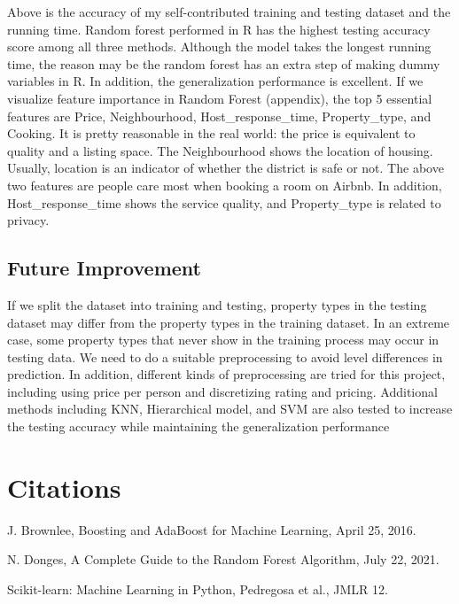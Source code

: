 \documentclass[11pt,]{article}
\begin{document}
Above is the accuracy of my self-contributed training and testing
dataset and the running time. Random forest performed in R has the
highest testing accuracy score among all three methods. Although the
model takes the longest running time, the reason may be the random
forest has an extra step of making dummy variables in R. In addition,
the generalization performance is excellent. If we visualize feature
importance in Random Forest (appendix), the top 5 essential features are
Price, Neighbourhood, Host\_response\_time, Property\_type, and Cooking.
It is pretty reasonable in the real world: the price is equivalent to
quality and a listing space. The Neighbourhood shows the location of
housing. Usually, location is an indicator of whether the district is
safe or not. The above two features are people care most when booking a
room on Airbnb. In addition, Host\_response\_time shows the service
quality, and Property\_type is related to privacy.

\hypertarget{future-improvement}{%
\subsection{Future Improvement}\label{future-improvement}}

If we split the dataset into training and testing, property types in the
testing dataset may differ from the property types in the training
dataset. In an extreme case, some property types that never show in the
training process may occur in testing data. We need to do a suitable
preprocessing to avoid level differences in prediction. In addition,
different kinds of preprocessing are tried for this project, including
using price per person and discretizing rating and pricing. Additional
methods including KNN, Hierarchical model, and SVM are also tested to
increase the testing accuracy while maintaining the generalization
performance

\hypertarget{citations}{%
\section{Citations}\label{citations}}

J. Brownlee, Boosting and AdaBoost for Machine Learning, April 25, 2016.

N. Donges, A Complete Guide to the Random Forest Algorithm, July 22,
2021.

Scikit-learn: Machine Learning in Python, Pedregosa et al., JMLR 12.

\newpage
\end{document}
